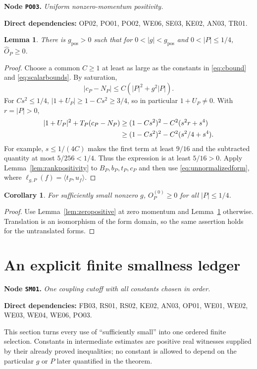 \documentclass[11pt,a4paper]{article}
\newtheorem{lemma}[theorem]{Lemma}
\newtheorem{corollary}[theorem]{Corollary}
\theoremstyle{remark}\newtheorem{remark}[theorem]{Remark}
\newcommand{\ip}[2]{\langle #1,#2\rangle}\newcommand{\norm}[1]{\lVert #1\rVert}
\newcommand{\abs}[1]{\lvert #1\rvert}\newcommand{\rankone}[2]{\lvert #1\rangle\langle #2\rvert}
\newcommand{\node}[3]{\par\Needspace{6\baselineskip}\smallskip\hypertarget{node:#1}{}\label{nodepage:#1}\noindent\textbf{Node \texttt{#1}.} \textit{#2.}\par\noindent\textbf{Direct dependencies:} #3.\par}
\begin{document}
\node{PO03}{Uniform nonzero-momentum positivity}{OP02, PO01, PO02, WE06, SE03, KE02, AN03, TR01}
\begin{lemma}\label{lem:nonzeropositive}
There is $g_{\mathrm{pos}}>0$ such that for $0<\abs g<g_{\mathrm{pos}}$ and $0<\abs P\leq1/4$, $\widehat O_P\geq0$.
\end{lemma}
\begin{proof}
Choose a common $C\geq1$ at least as large as the constants in \eqref{eq:cbound} and \eqref{eq:scalarbounds}. By saturation,
\[
 \abs{c_P-N_P}\leq C(\abs P^2+g^2\abs P).
\]
For $Cs^2\leq1/4$, $\abs{1+U_P}\geq1-Cs^2\geq3/4$, so in particular $1+U_P\ne0$. With $r=\abs P>0$,
\begin{align}
 \abs{1+U_P}^2+T_P(c_P-N_P)
 &\geq(1-Cs^2)^2-C^2(s^2r+s^4)\notag\\
 &\geq(1-Cs^2)^2-C^2(s^2/4+s^4).
 \label{eq:finalscalar}
\end{align}
For example, $s\leq1/(4C)$ makes the first term at least $9/16$ and the subtracted quantity at most $5/256<1/4$. Thus the expression is at least $5/16>0$. Apply Lemma~\ref{lem:rankpositivity} to $B_P,b_P,t_P,c_P$ and then use \eqref{eq:unnormalizedform}, where $\ell_{g,P}(f)=\ip{t_P}{u_f}$.
\end{proof}

\begin{corollary}\label{cor:thresholdpositive}
For sufficiently small nonzero $g$, $O_P^{(0)}\geq0$ for all $\abs P\leq1/4$.
\end{corollary}
\begin{proof}
Use Lemma~\ref{lem:zeropositive} at zero momentum and Lemma~\ref{lem:nonzeropositive} otherwise. Translation is an isomorphism of the form domain, so the same assertion holds for the untranslated forms.
\end{proof}

\section{An explicit finite smallness ledger}\label{sec:constants}
\node{SM01}{One coupling cutoff with all constants chosen in order}{FB03, RS01, RS02, KE02, AN03, OP01, WE01, WE02, WE03, WE04, WE06, PO03}
This section turns every use of ``sufficiently small'' into one ordered finite selection. Constants in intermediate estimates are positive real witnesses supplied by their already proved inequalities; no constant is allowed to depend on the particular $g$ or $P$ later quantified in the theorem.
\end{document}
